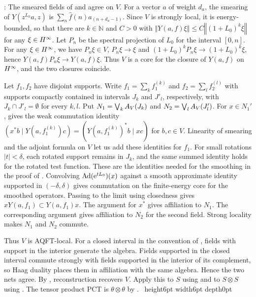 \documentclass[leqno]{article}
\newcommand{\N}{\ensuremath{\mathbb{N}}}
\let\cal\relax
\newcommand{\cal}{\mathcal}
\renewcommand{\leq}{\ensuremath{\leqslant}}
\newcommand{\qed}{\hfill \vrule height6pt  width6pt depth0pt}
\newcommand{\norm}[1]{\left\Vert#1\right\Vert}
\newcommand{\ot}{\otimes}
\let\i\relax
\newcommand{\i}{\mathrm{i}}
\newcommand{\e}{\mathrm{e}}
\newenvironment{proof}[1][]{\noindent {\it Proof #1} : }{\hbox{~}\qed
\smallskip
}
\numberwithin{equation}{section}
\begin{document}
\begin{proof}
The smeared fields of \cite[(106) p.~49]{CKLW18} and \cite[Definition 8.2]{HeT25} agree on $V$. For a vector $a$ of weight $d_a$, the smearing of $Y(z^{L_0}a,z)$ is $\sum_n \hat f(n)a_{(n+d_a-1)}$. Since $V$ is strongly local, it is energy-bounded, so that there are $k \in \N$ and $C > 0$ with $\norm{Y(a,f)\xi} \leq C\norm{(1+L_0)^k\xi}$ for any $\xi \in \cal H^\infty$. Let $P_n$ be the spectral projection of $L_0$ for the interval $[0,n]$. For any $\xi \in \cal H^\infty$, we have $P_n\xi \in V$, $P_n\xi \to \xi$ and $(1+L_0)^kP_n\xi \to (1+L_0)^k\xi$, hence $Y(a,f)P_n\xi \to Y(a,f)\xi$. Thus $V$ is a core for the closure of $Y(a,f)$ on $\cal H^\infty$, and the two closures coincide.

Let $f_1,f_2$ have disjoint supports. Write $f_1=\sum_k f_1^{(k)}$ and $f_2=\sum_l f_2^{(l)}$ with supports compactly contained in intervals $J_k$ and $J'_l$, respectively, with $J_k\cap J'_l=\emptyset$ for every $k,l$. Put $N_1=\bigvee_k\cal A_V(J_k)$ and $N_2=\bigvee_l\cal A_V(J'_l)$. For $x\in N_1'$, \cite[Lemma 6.5]{CKLW18} gives the weak commutation identity $(x^*b\mid Y(a,f_1^{(k)})c)=(Y(a,f_1^{(k)})^*b\mid xc)$ for $b,c\in V$. Linearity of smearing and the adjoint formula on $V$ \cite[(95) and (113)]{CKLW18} let us add these identities for $f_1$. For small rotations $|t|<\delta$, each rotated support remains in $J_k$, and the same summed identity holds for the rotated test function. These are the identities needed for the smoothing in the proof of \cite[Lemma 6.5]{CKLW18}. Convolving $\operatorname{Ad}(\e^{\i tL_0})(x)$ against a smooth approximate identity supported in $(-\delta,\delta)$ gives commutation on the finite-energy core for the smoothed operators. Passing to the limit using closedness gives $xY(a,f_1)\subset Y(a,f_1)x$. The argument for $x^*$ gives affiliation to $N_1$. The corresponding argument gives affiliation to $N_2$ for the second field. Strong locality makes $N_1$ and $N_2$ commute.

Thus $V$ is AQFT-local. For a closed interval in the convention of \cite{HeT25}, fields with support in the interior generate the \cite{CKLW18} algebra. Fields supported in the closed interval commute strongly with fields supported in the interior of its complement, so Haag duality places them in affiliation with the same algebra. Hence the two nets agree. By \cite[Theorem 8.9(ii) p.~66]{HeT25}, reconstruction recovers $V$. Apply this to $S$ using \cite[Theorem 4.5]{ArhII} and to $S\ot S$ using \cite[Corollary 8.2 p.~62]{CKLW18}. The tensor product PCT is $\theta \ot \theta$ by \cite[Proposition 5.1 p.~33]{CKLW18}.
\end{proof}
\end{document}
